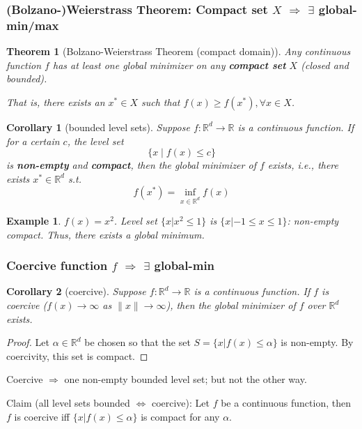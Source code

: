 \documentclass[11pt,a4paper]{article}
\newtheorem{theorem}{Theorem}
\newtheorem{example}{Example}
\newtheorem{corollary}{Corollary}
\begin{document}
\subsubsection{(Bolzano-)Weierstrass Theorem: Compact set $X$ $\Rightarrow$ $\exists$ global-min/max}
\begin{theorem}[Bolzano-Weierstrass Theorem (compact domain)]
    Any continuous function $f$ has at least one global minimizer on any \textbf{compact set} $X$ (closed and bounded).

    That is, there exists an $x^{*} \in X$ such that $f(x) \geq f\left(x^{*}\right), \forall x \in X$.
\end{theorem}

\begin{corollary}[bounded level sets]
    Suppose $f: \mathbb{R}^{d} \rightarrow \mathbb{R}$ is a continuous function. If for a certain $c$, the level set
    $$
    \{x \mid f(x) \leq c\}
    $$
    is \textbf{non-empty} and \textbf{compact}, then the global minimizer of $f$ exists, i.e., there exists $x^{*} \in \mathbb{R}^{d}$ s.t.
    $$
    f\left(x^{*}\right)=\inf _{x \in \mathbb{R}^{d}} f(x)
    $$
\end{corollary}
\begin{example}
    $f(x) = x^2$.
    Level set $\{x|x^2 \leq 1\}$ is $\{x|-1\leq x\leq 1\}$: non-empty compact. Thus, there exists a global minimum.
\end{example}

\subsubsection{Coercive function $f$ $\Rightarrow$ $\exists$ global-min}
\begin{corollary}[coercive]
    Suppose $f: \mathbb{R}^{d} \rightarrow \mathbb{R}$ is a continuous function. If $f$ is coercive ($f(x) \rightarrow \infty$ as $\|x\| \rightarrow \infty$), then the global minimizer of $f$ over $\mathbb{R}^{d}$ exists.
\end{corollary}
\begin{proof}
Let $\alpha\in \mathbb{R}^d$ be chosen so that the set $S = \{x |f(x) \leq \alpha\}$ is non-empty. By coercivity,
this set is compact.
\end{proof}
Coercive $\Rightarrow$ one non-empty bounded level set; but not the other way.

Claim (all level sets bounded $\Leftrightarrow$ coercive): Let $f$ be a continuous function, then $f$ is coercive iff $\{x | f(x) \leq \alpha\}$ is compact for any $\alpha$.
\end{document}
